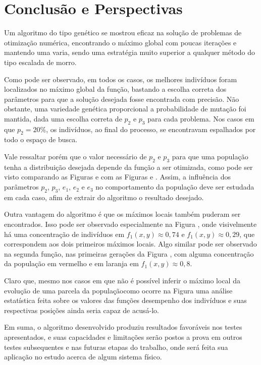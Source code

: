 \chapter{Conclusão e Perspectivas}\label{cap_conclusao}

Um algoritmo do tipo genético se mostrou eficaz na solução de problemas de otimização
numérica, encontrando o máximo global com poucas iterações e mantendo uma varia, sendo uma
estratégia muito superior a qualquer método do tipo escalada de morro. 

Como pode ser observado, em todos os casos, os melhores indivíduos foram localizados no máximo global
da função, bastando a escolha correta dos parâmetros para que a solução desejada
fosse encontrada com precisão. Não obstante, uma variedade genética proporcional a
probabilidade de mutação foi mantida, dada uma escolha correta de $p_2$ e $p_3$ para cada
problema. Nos casos em que $p_2 = 20\%$, os indivíduos, ao final do processo, se encontravam
espalhados por todo o espaço de busca. 

Vale ressaltar porém que o valor necessário de $p_2$ e $p_3$ para que uma população 
tenha a distribuição desejada depende da função a ser otimizada, como pode ser visto
comparando as Figuras  e 
com as Figuras  e .
Assim, a influência dos parâmetros $p_2$, $p_3$, $e_1$, $e_2$ e $e_3$ no comportamento da população
deve ser estudada em cada caso, afim de extrair do algoritmo o resultado desejado.

Outra vantagem do algoritmo é que os máximos locais também puderam ser encontrados.
Isso pode ser observado especialmente na Figura ,
onde visivelmente há uma concentração de indivíduos em $ f_1(x,y) \approx 0,74 $ e 
$ f_1(x,y) \approx 0,29 $, que correspondem aos dois primeiros máximos locais.
Algo similar pode ser observado na segunda função, nas primeiras gerações da Figura 
, com alguma concentração da população em
vermelho e em laranja em $f_1(x,y) \approx 0,8$.

Claro que, mesmo nos casos em que não é possível inferir o máximo local da evolução
de uma parcela da população\trav como ocorre na Figura \trav
uma análise estatística feita sobre os valores das funções desempenho dos indivíduos e
suas respectivas posições ainda seria capaz de acusá-lo.

Em suma, o algoritmo desenvolvido produziu resultados favoráveis nos testes apresentados, e suas capacidades
e limitações serão postos a prova em outros testes subsequentes e nas futuras etapas do trabalho, 
onde será feita sua aplicação no estudo acerca de algum sistema físico.

\nocite{charbonneau2002ga}